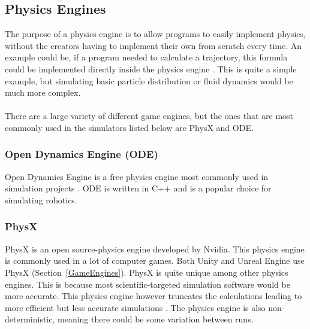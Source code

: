 \subsection{Physics Engines}
The purpose of a physics engine is to allow programs to easily implement physics, without the creators having to implement their own from scratch every time. An example could be, if a program needed to calculate a trajectory, this formula could be implemented directly inside the physics engine \cite{millington2007game}. This is quite a simple example, but simulating basic particle distribution or fluid dynamics would be much more complex. 
\\~\\
There are a large variety of different game engines, but the ones that are most commonly used in the simulators listed below are PhysX and ODE.

\subsubsection{Open Dynamics Engine (ODE)}
Open Dynamics Engine is a free physics engine most commonly used in simulation projects \cite{ODEPaper}. ODE is written in C++ and is a popular choice for simulating robotics. 

\subsubsection{PhysX}
PhysX is an open source-physics engine developed by Nvidia. This physics engine is commonly used in a lot of computer games. Both Unity and Unreal Engine use PhysX (Section~\ref{GameEngines}). PhysX is quite unique among other physics engines. This is because most scientific-targeted simulation software would be more accurate. This physics engine however truncates the calculations leading to more efficient but less accurate simulations \cite{Martinez-FrancoJuanC2018PAAM}. The physics engine is also non-deterministic, meaning there could be some variation between runs. 





